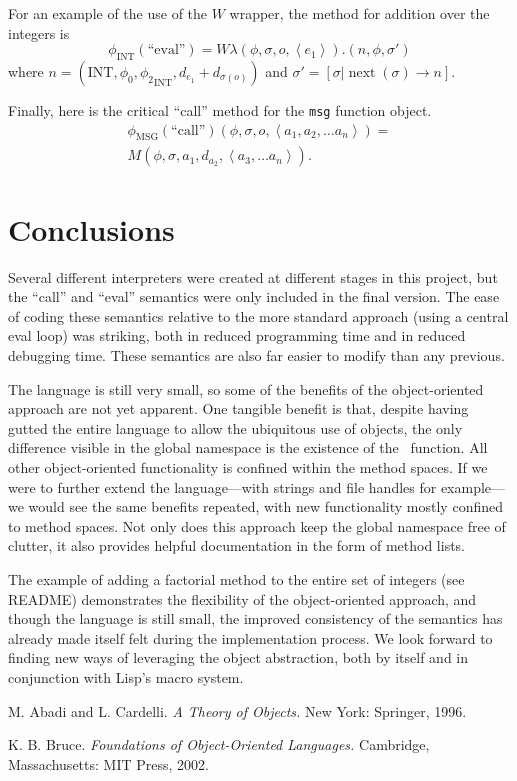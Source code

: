 \documentclass[twocolumn]{article}
\begin{document}
For an example of the use of the $W$ wrapper, the method for addition
over the integers is
\[ \phi_{\text{INT}}(\text{``eval''}) = W
\lambda(\phi,\sigma,o,\left<e_1\right>).(n,\phi,\sigma') \] where
$n = (\text{INT},\phi_0,{\phi_2}_{\text{INT}},d_{e_1}+d_{\sigma(o)})$ and
$\sigma' = [\sigma|\operatorname{next}(\sigma)\rightarrow n]$.

Finally, here is the critical ``call'' method for the \texttt{msg}
function object.
\begin{multline*}
  \phi_{\text{MSG}}(\text{``call''})(\phi,\sigma,o,\left<a_1,a_2,
  \ldots a_n \right>) = \\M(\phi,\sigma,a_1,d_{a_2}, \left<a_3,\ldots
  a_n\right>).
\end{multline*}


\section*{Conclusions}
Several different interpreters were created at different stages in
this project, but the ``call'' and ``eval'' semantics were only
included in the final version. The ease of coding these semantics
relative to the more standard approach (using a central eval loop) was
striking, both in reduced programming time and in reduced debugging
time. These semantics are also far easier to modify than any previous.

The language is still very small, so some of the benefits of the
object-oriented approach are not yet apparent. One tangible benefit is
that, despite having gutted the entire language to allow the
ubiquitous use of objects, the only difference visible in the global
namespace is the existence of the \msg\ function. All other
object-oriented functionality is confined within the method spaces. If
we were to further extend the language---with strings and file handles
for example---we would see the same benefits repeated, with new
functionality mostly confined to method spaces. Not only does this
approach keep the global namespace free of clutter, it also provides
helpful documentation in the form of method lists.

The example of adding a factorial method to the entire set of integers
(see README) demonstrates the flexibility of the object-oriented
approach, and though the language is still small, the improved
consistency of the semantics has already made itself felt during the
implementation process. We look forward to finding new ways of
leveraging the object abstraction, both by itself and in conjunction
with Lisp's macro system.

\begin{thebibliography}{9}
 M. Abadi and L. Cardelli. \textit{A Theory of Objects.} New
  York: Springer, 1996.

 K. B. Bruce. \textit{Foundations of Object-Oriented
    Languages.} Cambridge, Massachusetts: MIT Press, 2002.
\end{thebibliography}
\end{document}
